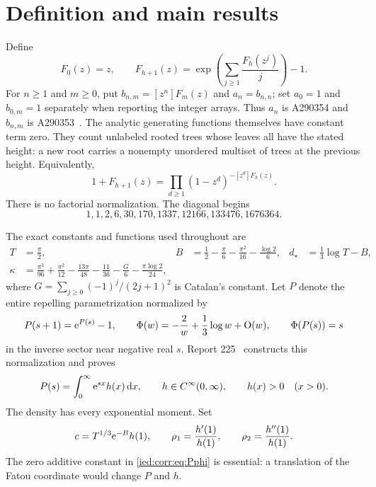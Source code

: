\documentclass[11pt,letterpaper]{article}
\theoremstyle{remark}\newtheorem{remark}[theorem]{Remark}
\newcommand{\Oh}{\mathrm O}\newcommand{\supp}{\operatorname{supp}}
\begin{document}
\section{Definition and main results}\label{ied:corr:sec:statement}
Define
\begin{equation}\label{ied:corr:eq:rec}
 F_0(z)=z,\qquad
 F_{h+1}(z)=\exp\left(\sum_{j\ge1}\frac{F_h(z^j)}j\right)-1.
\end{equation}
For $n\ge1$ and $m\ge0$, put $b_{n,m}=[z^n]F_m(z)$ and $a_n=b_{n,n}$; set $a_0=1$ and $b_{0,m}=1$ separately when reporting the integer arrays. Thus $a_n$ is A290354 and $b_{n,m}$ is A290353~\cite{A290354,A290353}. The analytic generating functions themselves have constant term zero. They count unlabeled rooted trees whose leaves all have the stated height: a new root carries a nonempty unordered multiset of trees at the previous height. Equivalently,
\[
 1+F_{h+1}(z)=\prod_{d\ge1}(1-z^d)^{-[z^d]F_h(z)}.
\]
There is no factorial normalization. The diagonal begins
\[
 1,1,2,6,30,170,1337,12166,133476,1676364.
\]

The exact constants and functions used throughout are
\begin{align}\label{ied:corr:eq:constants}
 T&=\frac\pi2,&
 B&=\frac12-\frac\pi6-\frac{\pi^2}{16}-\frac{\log2}{6},&
 d_\star&=\frac13\log T-B,\\
 \kappa&=\frac{\pi^3}{96}+\frac{\pi^2}{12}-\frac{13\pi}{48}
        -\frac{11}{36}-\frac{G}{6}-\frac{\pi\log2}{24},&&&\label{ied:corr:eq:kappa}
\end{align}
where $G=\sum_{j\ge0}(-1)^j/(2j+1)^2$ is Catalan's constant. Let $P$ denote the entire repelling parametrization normalized by
\begin{equation}\label{ied:corr:eq:Pphi}
 P(s+1)=\e^{P(s)}-1,\qquad
 \Phi(w)=-\frac2w+\frac13\log w+\Oh(w),\qquad \Phi(P(s))=s
\end{equation}
in the inverse sector near negative real $s$. Report 225~\cite{R225} constructs this normalization and proves
\begin{equation}\label{ied:corr:eq:density}
 P(s)=\int_0^\infty \mathrm e^{sx}h(x)\,\mathrm d x,\qquad
 h\in C^\infty(0,\infty),\qquad h(x)>0\quad(x>0).
\end{equation}
The density has every exponential moment. Set
\begin{equation}\label{ied:corr:eq:rhos}
 c=T^{1/3}\mathrm e^{-B}h(1),\qquad
 \rho_1=\frac{h'(1)}{h(1)},\qquad \rho_2=\frac{h''(1)}{h(1)}.
\end{equation}
The zero additive constant in \eqref{ied:corr:eq:Pphi} is essential: a translation of the Fatou coordinate would change $P$ and $h$.
\end{document}
